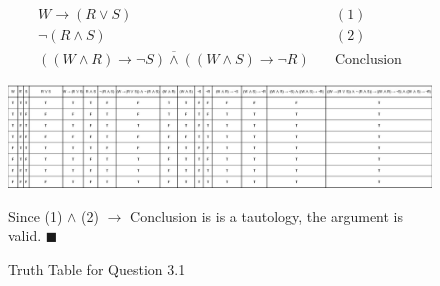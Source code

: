 \documentclass[]{article}
\begin{document}
\begin{center}
\end{center}    
\begin{align*}
    W \rightarrow (R \lor S) & \quad (1) \\
    \neg(R \land S) & \quad (2) \\
    \overline{((W \land R) \rightarrow \neg S) \land ((W \land S) \rightarrow \neg R)} &  \quad \text{Conclusion}
\end{align*}

\begin{figure}[h!]
    \begin{center}
        \includegraphics[totalheight=4cm]{images/Q3P1.jpg}
        
    \end{center}
    \caption{Since (1) $\land$ (2) $\to$ Conclusion is is a tautology, the argument is valid. $\blacksquare$}
    \caption{Truth Table for Question 3.1}
\end{figure}
\end{document}
